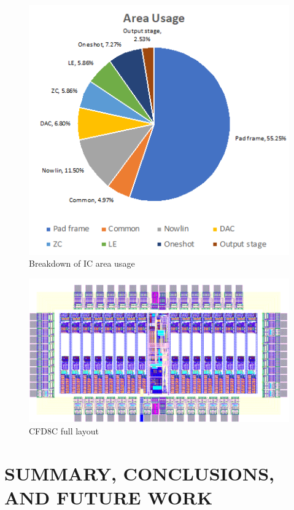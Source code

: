 \documentclass[12pt,oneside,final]{siuethesis}
\theoremstyle{definition}
\begin{document}
\begin{figure}[htbp!]
 \centering
 \includegraphics[scale=1.2]{./ch4_figures/area_usage.png}
 \caption{Breakdown of IC area usage}
 \label{fig:area}
\end{figure} 

\begin{figure}[htbp!]
 \centering
 \includegraphics[scale=.6,angle=90]{./ch4_figures/cfd_chip.png}
 \caption{CFD8C full layout}
 \label{fig:layout}
\end{figure} 


\chapter{SUMMARY, CONCLUSIONS, AND FUTURE WORK}
\end{document}
